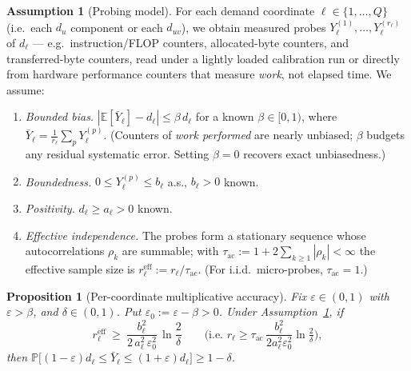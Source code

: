 \documentclass{amsart}
\newtheorem{proposition}{Proposition}
\theoremstyle{definition}
\newtheorem{assumption}{Assumption}
\newcommand{\E}{\mathbb{E}}
\renewcommand{\Pr}{\mathbb{P}}
\begin{document}
\begin{assumption}[Probing model]\label{ass:probe}
For each demand coordinate $\ell\in\{1,\dots,Q\}$ (i.e.\ each $d_u$ component or
each $d_{uv}$), we obtain measured probes $Y^{(1)}_\ell,\dots,Y^{(r_\ell)}_\ell$
of $d_\ell$ — e.g.\ instruction/FLOP counters, allocated-byte counters, and
transferred-byte counters, read under a lightly loaded calibration run or
directly from hardware performance counters that measure \emph{work}, not
elapsed time. We assume:
\begin{enumerate}
\item[(M1$'$)] \emph{Bounded bias.} $|\E[\bar Y_\ell]-d_\ell|\le\beta\,d_\ell$
for a known $\beta\in[0,1)$, where $\bar Y_\ell=\frac1{r_\ell}\sum_p Y^{(p)}_\ell$.
(Counters of \emph{work performed} are nearly unbiased; $\beta$ budgets any
residual systematic error. Setting $\beta=0$ recovers exact unbiasedness.)
\item[(M2)] \emph{Boundedness.} $0\le Y^{(p)}_\ell\le b_\ell$ a.s., $b_\ell>0$ known.
\item[(M3)] \emph{Positivity.} $d_\ell\ge a_\ell>0$ known.
\item[(M4)] \emph{Effective independence.} The probes form a stationary sequence
whose autocorrelations $\rho_k$ are summable; with
$\tau_{\mathrm{ac}}:=1+2\sum_{k\ge1}|\rho_k|<\infty$ the effective sample size is
$r_\ell^{\mathrm{eff}}:=r_\ell/\tau_{\mathrm{ac}}$. (For i.i.d.\ micro-probes,
$\tau_{\mathrm{ac}}=1$.)
\end{enumerate}
\end{assumption}

\begin{proposition}[Per-coordinate multiplicative accuracy]\label{prop:samples}
Fix $\varepsilon\in(0,1)$ with $\varepsilon>\beta$, and $\delta\in(0,1)$. Put
$\varepsilon_0:=\varepsilon-\beta>0$. Under
Assumption~\ref{ass:probe}, if
\begin{equation}\label{eq:rbound}
r_\ell^{\mathrm{eff}}\ \ge\ \frac{b_\ell^2}{2\,a_\ell^2\,\varepsilon_0^2}\,
\ln\frac2\delta
\qquad\Big(\text{i.e. } r_\ell\ge \tau_{\mathrm{ac}}\,\frac{b_\ell^2}{2a_\ell^2\varepsilon_0^2}\ln\tfrac2\delta\Big),
\end{equation}
then $\Pr\big[(1-\varepsilon)d_\ell\le \bar Y_\ell\le(1+\varepsilon)d_\ell\big]\ge1-\delta$.
\end{proposition}
\end{document}
